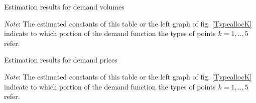 %
%

\begin{table}[!ht]
\vspace{2cm}
\begin{center}

\caption{\label{VolDEPur52} Estimation results for demand volumes}
\end{center}
\emph{Note}: The estimated constants of this table or the left graph of fig. \ref{TypeallocK} indicate to which portion of the demand function the types of points $k=1,..,5$ refer. \\
\end{table}
%
\begin{table}[!ht]
\begin{center}

\caption{\label{PriceDEPur52} Estimation results for demand prices }
\end{center}
\emph{Note}: The estimated constants of this table  or the left graph of fig. \ref{TypeallocK} indicate to which portion of the demand function the types of points $k=1,..,5$ refer. \\
\end{table}
\restoregeometry


